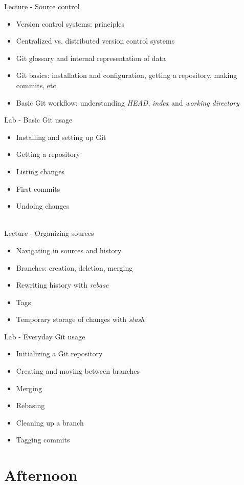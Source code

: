 \documentclass[a4paper,12pt,obeyspaces,spaces,hyphens]{article}
\begin{document}
\feagendatwocolumn
{Lecture - Source control}
{
  \begin{itemize}
  \item Version control systems: principles
  \item Centralized vs. distributed version control systems
  \item Git glossary and internal representation of data
  \item Git basics: installation and configuration, getting a repository, making commits, etc.
  \item Basic Git workflow: understanding {\em HEAD}, {\em index} and {\em working directory}
  \end{itemize}
}
{Lab - Basic Git usage}
{
  \begin{itemize}
  \item Installing and setting up Git
  \item Getting a repository
  \item Listing changes
  \item First commits
  \item Undoing changes
  \end{itemize}
}
\\
\feagendatwocolumn
{Lecture - Organizing sources}
{
  \begin{itemize}
  \item Navigating in sources and history
  \item Branches: creation, deletion, merging
  \item Rewriting history with {\em rebase}
  \item Tags
  \item Temporary storage of changes with {\em stash}
  \end{itemize}
}
{Lab - Everyday Git usage}
{
  \begin{itemize}
  \item Initializing a Git repository
  \item Creating and moving between branches
  \item Merging
  \item Rebasing
  \item Cleaning up a branch
  \item Tagging commits
  \end{itemize}
}

\section{Afternoon}
\end{document}
